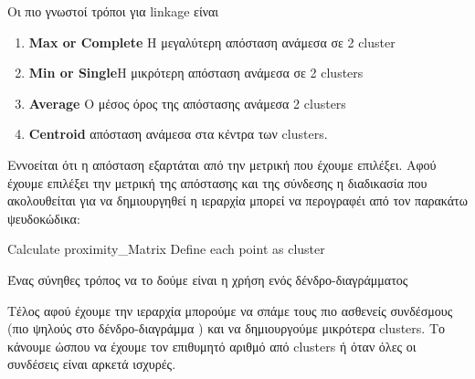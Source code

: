 Οι πιο γνωστοί τρόποι για linkage είναι 
\begin{enumerate}
\item \textbf{Max or Complete }Η μεγαλύτερη απόσταση ανάμεσα σε 2 cluster
\item \textbf{Min or Single}H μικρότερη απόσταση ανάμεσα σε 2 clusters 
\item \textbf{Average }Ο μέσος όρος της απόστασης  ανάμεσα 2 clusters 
\item \textbf{Centroid } απόσταση ανάμεσα στα κέντρα των clusters.
\end{enumerate}
Εννοείται ότι η απόσταση εξαρτάται από την μετρική που έχουμε επιλέξει.
 Αφού έχουμε επιλέξει την μετρική της απόστασης και της σύνδεσης η διαδικασία που ακολουθείται για να δημιουργηθεί η ιεραρχία μπορεί να περογραφέι από τον παρακάτω ψευδοκώδικα:
 
\begin{algorithm}[H]
Calculate proximity\_Matrix\;
Define each point as cluster\;
\end{algorithm}

\noindent\begin{minipage}{\linewidth}
\centering
{}
Ένας σύνηθες τρόπος να το δούμε είναι η  χρήση ενός δένδρο-διαγράμματος
\label{fig:dentro1}
\end{minipage}
 
Τέλος αφού έχουμε την ιεραρχία μπορούμε να σπάμε τους πιο ασθενείς συνδέσμους
(πιο ψηλούς στο δένδρο-διαγράμμα )
και να δημιουργούμε μικρότερα clusters.
Το κάνουμε ώσπου να έχουμε τον επιθυμητό αριθμό από clusters
ή όταν όλες οι συνδέσεις είναι αρκετά ισχυρές.


